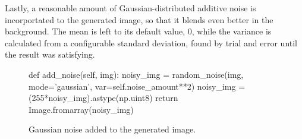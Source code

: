 Lastly, a reasonable amount of Gaussian-distributed additive noise is
incorportated to the generated image, so that it blends even better in the
background. The mean is left to its default value, 0, while the variance is
calculated from a configurable standard deviation, found by trial and error
until the result was satisfying.

\begin{figure}[h!]
    \centering
    \caption{Gaussian noise added to the generated image.}
    \begin{python}
        def add_noise(self, img):
            noisy_img = random_noise(img, mode='gaussian',
                                     var=self.noise_amount**2)
            noisy_img = (255*noisy_img).astype(np.uint8)
            return Image.fromarray(noisy_img)
    \end{python}
\end{figure}
